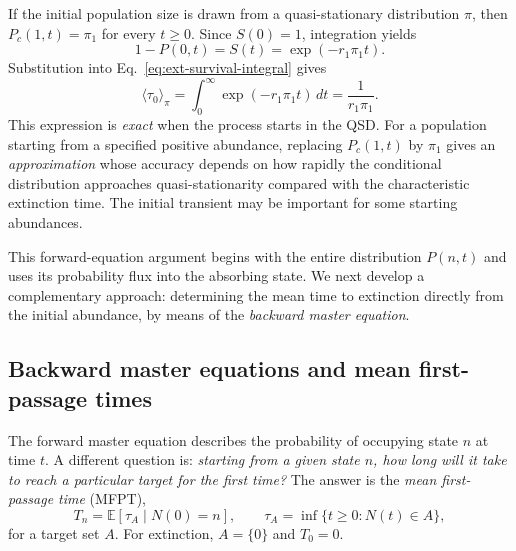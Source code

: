 If the initial population size is drawn from a quasi-stationary
distribution $\pi$, then $P_c(1,t)=\pi_1$ for every $t\geq0$.
Since $S(0)=1$, integration yields
\begin{equation}
 1-P(0,t)=S(t)=\exp(-r_1\pi_1t).
 \label{eq:ext-qsd-survival}
\end{equation}
Substitution into Eq.~\eqref{eq:ext-survival-integral} gives
\begin{equation}
 \boxed{\langle \tau_0\rangle_{\pi}
    =\int_0^\infty\exp(-r_1\pi_1t)\,dt
    =\frac{1}{r_1\pi_1}.}
 \label{eq:ext-qsd-mean}
\end{equation}
This expression is \emph{exact} when the process starts in the QSD.
For a population starting from a specified positive abundance,
replacing $P_c(1,t)$ by $\pi_1$ gives an \emph{approximation} whose
accuracy depends on how rapidly the conditional distribution approaches
quasi-stationarity compared with the characteristic extinction time.
The initial transient may be important for some starting abundances.

This forward-equation argument begins with the entire distribution
$P(n,t)$ and uses its probability flux into the absorbing state.
We next develop a complementary approach: determining the mean time
to extinction directly from the initial abundance, by means of the
\emph{backward master equation}.

\subsection{Backward master equations and mean first-passage times}
\label{subsec:ext-backward}

The forward master equation describes the probability of occupying state
$n$ at time $t$. A different question is: \emph{starting from a given
state $n$, how long will it take to reach a particular target for the
first time?} The answer is the \emph{mean first-passage time} (MFPT),
\begin{equation}
 T_n=\mathbb E[\tau_A\mid N(0)=n],\qquad
 \tau_A=\inf\{t\geq0:N(t)\in A\},
 \label{eq:ext-mfpt-def}
\end{equation}
for a target set $A$. For extinction, $A=\{0\}$ and $T_0=0$.

